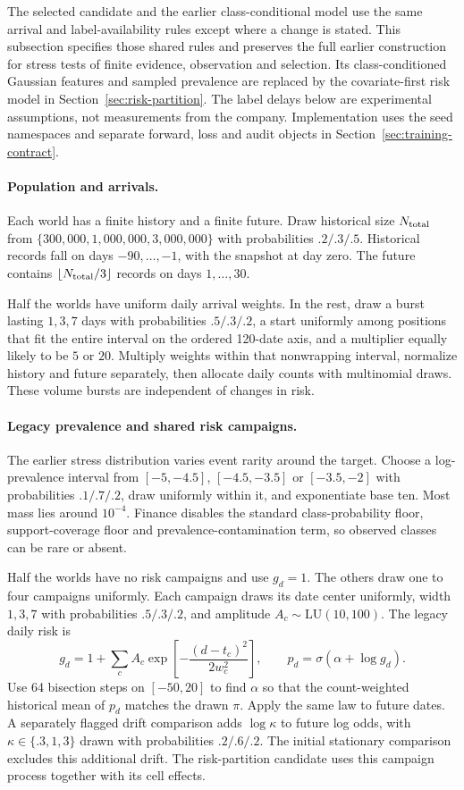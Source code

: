 \documentclass[11pt]{article}
\begin{document}
The selected candidate and the earlier class-conditional model use the same arrival and label-availability rules except where a change is stated. This subsection specifies those shared rules and preserves the full earlier construction for stress tests of finite evidence, observation and selection. Its class-conditioned Gaussian features and sampled prevalence are replaced by the covariate-first risk model in Section~\ref{sec:risk-partition}. The label delays below are experimental assumptions, not measurements from the company. Implementation uses the seed namespaces and separate forward, loss and audit objects in Section~\ref{sec:training-contract}.

\paragraph{Population and arrivals.} Each world has a finite history and a finite future. Draw historical size $N_{\rm total}$ from $\{300{,}000,1{,}000{,}000,3{,}000{,}000\}$ with probabilities $.2/.3/.5$. Historical records fall on days $-90,\ldots,-1$, with the snapshot at day zero. The future contains $\lfloor N_{\rm total}/3\rfloor$ records on days $1,\ldots,30$.

Half the worlds have uniform daily arrival weights. In the rest, draw a burst lasting $1,3,7$ days with probabilities $.5/.3/.2$, a start uniformly among positions that fit the entire interval on the ordered 120-date axis, and a multiplier equally likely to be $5$ or $20$. Multiply weights within that nonwrapping interval, normalize history and future separately, then allocate daily counts with multinomial draws. These volume bursts are independent of changes in risk.

\paragraph{Legacy prevalence and shared risk campaigns.} The earlier stress distribution varies event rarity around the target. Choose a log-prevalence interval from $[-5,-4.5]$, $[-4.5,-3.5]$ or $[-3.5,-2]$ with probabilities $.1/.7/.2$, draw uniformly within it, and exponentiate base ten. Most mass lies around $10^{-4}$. Finance disables the standard class-probability floor, support-coverage floor and prevalence-contamination term, so observed classes can be rare or absent.

Half the worlds have no risk campaigns and use $g_d=1$. The others draw one to four campaigns uniformly. Each campaign draws its date center uniformly, width $1,3,7$ with probabilities $.5/.3/.2$, and amplitude $A_c\sim\mathrm{LU}(10,100)$. The legacy daily risk is
\[
g_d=1+\sum_c A_c\exp\!\left[-\frac{(d-t_c)^2}{2w_c^2}\right],
\qquad p_d=\sigma(\alpha+\log g_d).
\]
Use 64 bisection steps on $[-50,20]$ to find $\alpha$ so that the count-weighted historical mean of $p_d$ matches the drawn $\pi$. Apply the same law to future dates. A separately flagged drift comparison adds $\log\kappa$ to future log odds, with $\kappa\in\{.3,1,3\}$ drawn with probabilities $.2/.6/.2$. The initial stationary comparison excludes this additional drift. The risk-partition candidate uses this campaign process together with its cell effects.
\end{document}
